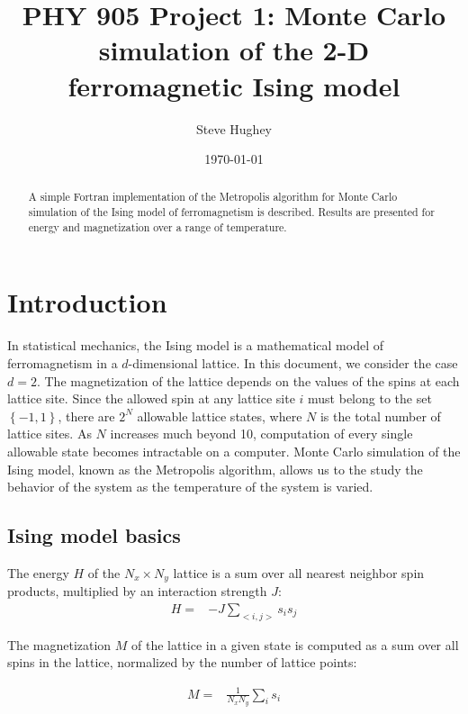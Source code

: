 \documentclass[]{article}
\begin{document}
\title{PHY 905 Project 1: Monte Carlo simulation of the 2-D ferromagnetic Ising model}

\author{Steve Hughey}

\date{\today}

\maketitle

\begin{abstract}
A simple Fortran implementation of the Metropolis algorithm for Monte Carlo simulation of the Ising model of ferromagnetism is described. Results are presented for energy and magnetization over a range of temperature.
\end{abstract}

\section{\label{sec:intro}Introduction}

In statistical mechanics, the Ising model is a mathematical model of ferromagnetism in a $d$-dimensional lattice. In this document, we consider the case $d=2$. The magnetization of the lattice depends on the values of the spins at each lattice site. Since the allowed spin at any lattice site $i$ must belong to the set $\left\lbrace -1, 1 \right\rbrace$, there are $2^N$ allowable lattice states, where $N$ is the total number of lattice sites. As $N$ increases much beyond 10, computation of every single allowable state becomes intractable on a computer. Monte Carlo simulation of the Ising model, known as the Metropolis algorithm, allows us to the study the behavior of the system as the temperature of the system is varied.

\subsection{\label{sec:ising}Ising model basics}

The energy $H$ of the $N_x \times N_y$ lattice is a sum over all nearest neighbor spin products, multiplied by an interaction strength $J$:
\begin{align}
H =& -J \sum_{<i,j>} s_i s_j
\end{align}

The magnetization $M$ of the lattice in a given state is computed as a sum over all spins in the lattice, normalized by the number of lattice points:

\begin{align}
M =& \frac{1}{N_x N_y}\sum_{i} s_i
\end{align}
\end{document}
